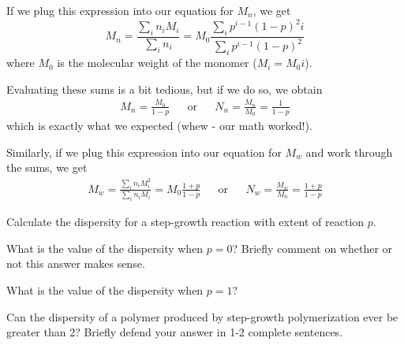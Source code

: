 \begin{activity}
\begin{model}
	If we plug this expression into our equation for $M_n$, we get
	\begin{equation*}
		M_n = \frac{\sum_i n_i M_i}{\sum_i n_i} %
		= M_0\frac{\sum_i p^{i-1}(1-p)^2 i }{\sum_i p^{i-1}(1-p)^2}
	\end{equation*}
	where $M_0$ is the molecular weight of the monomer ($M_i = M_0 i$).
	
	Evaluating these sums is a bit tedious, but if we do so, we obtain
	\begin{align*}
		M_n = \frac{M_0}{1-p} && \text{or} && N_n = \frac{M_n}{M_0} = \frac{1}{1-p}
	\end{align*}
	which is exactly what we expected (whew - our math worked!).
	
	Similarly, if we plug this expression into our equation for $M_w$ and work through the sums, we get
	\begin{align*}
		M_w = \frac{\sum_i n_i M_i^2}{\sum_i n_i M_i} = M_0\frac{1+p}{1-p} && \text{or} && N_w = \frac{M_w}{M_0} = \frac{1+p}{1-p}
	\end{align*}

\end{model}

\begin{ctqs}
		\question Calculate the dispersity for a step-growth reaction with extent of reaction $p$.
		
			\begin{solution}[1in]
			\end{solution}
			
			
		\question What is the value of the dispersity when $p=0$?  Briefly comment on whether or not this answer makes sense.
		
			\begin{solution}[1.5in]
			\end{solution}
			
			
		\question What is the value of the dispersity when $p=1$?
		
			\begin{solution}[0.5in]
			\end{solution}
			
			
			
		\question Can the dispersity of a polymer produced by step-growth polymerization ever be greater than 2?  Briefly defend your answer in 1-2 complete sentences.
		
			\begin{solution}[1in]
			\end{solution}
			

\end{ctqs}
\end{activity}
